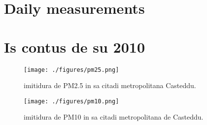 \documentclass[a4paper]{article}
\begin{document}
\section{Daily measurements}




\section{Is contus de su 2010}

\begin{figure}[tbp]
    \centering
    \texttt{[image: ./figures/pm25.png]}
    \caption{imitidura de PM2.5 in sa citadi metropolitana Casteddu.}
    \label{fig:pm25-prov-casteddu}
\end{figure}

\begin{figure}[tbp]
    \centering
    \texttt{[image: ./figures/pm10.png]}
    \caption{imitidura de PM10 in sa citadi metropolitana  de Casteddu.}
    \label{fig:pm10-prov-casteddu}
\end{figure}

\printbibliography
\end{document}
